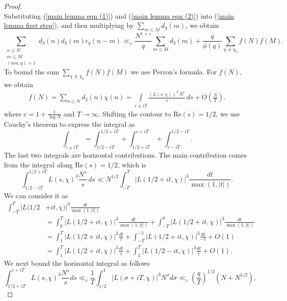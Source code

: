 \documentclass[oneside,reqno,10pt]{amsart}
\numberwithin{equation}{section}
\theoremstyle{plain}
\theoremstyle{definition}
\numberwithin{equation}{section}
\begin{document}
\begin{proof}
\begin{equation}
\end{equation}
Substituting (\ref{main lemma eqn (1)}) and (\ref{main lemma eqn (2)}) into (\ref{main lemma first step}), and then multiplying by $\sum_{m\leq M} d_3(m)$, we obtain
\begin{equation}\label{goal of the main lemma}
    \sum_{\substack{n\leq N\\m\leq M \\ (nm,q)=1}} d_3(n)d_3(m)c_q(n-m) \ll_{\varepsilon} \frac{N^{1+\varepsilon}}{q}\sum_{m\leq M}d_3(m) + \frac{q}{\phi(q)}\sum_{\chi \neq \chi_0} f(N)f(M).
\end{equation}
To bound the sum $\sum_{\chi\neq \chi_0} f(N)f(M)$ we use Perron's formula. For $f(N)$, we obtain
\begin{align*}
f(N) = \sum_{n \leq N} d_{3}(n)   \chi(n) = \int\limits_{c\pm iT} \frac{(L(s, \chi))^3\ N^s}{s} \, ds + O\left( \frac{N}{T} \right).
\end{align*}
where  $c = 1 + \frac{1}{\log N}$  and $T\to \infty$. Shifting the contour to Re$(s)=1/2$, we use Cauchy's theorem to express the integral as
\begin{equation*}
    \int_{c \pm iT} = \int_{1/2-iT}^{1/2+iT} + \int_{1/2+iT}^{c+iT} + \int_{c-iT}^{1/2-iT}. 
\end{equation*}
The last two integrals are horizontal contributions. The main contribution comes from the integral along Re$(s)=1/2$, which is
\begin{equation*}
    \int_{1/2-iT}^{1/2+iT}L(s,\chi)^3\frac{N^s}{s}\, ds\ll N^{1/2}\int_{-T}^T|L(1/2+it,\chi)|^3\frac{dt}{\max(1,|t|)}.
\end{equation*}
We can consider it as
    \begin{align}\nonumber
        \int_{-T}^T|L(1/2&+it,\chi)|^3\frac{dt}{\max(1,|t|)}\\ \nonumber
        &=\int_{0}^T|L(1/2+it,\chi)|^3\frac{dt}{\max(1,|t|)}+\int_{-T}^0|L(1/2+it,\chi)|^3\frac{dt}{\max(1,|t|)}\\ \nonumber
        &=\int_{1}^T|L(1/2+it,\chi)|^3\frac{dt}{t}+\int_{-T}^{-1}|L(1/2+it,\chi)|^3\frac{dt}{-t}+O(1)\\ 
        &=\int_{1}^T|L(1/2+it,\chi)|^3\frac{dt}{t}+\int_{1}^{T}|L(1/2-it,\chi)|^3\frac{dt}{t}+O(1).
    \end{align} 
We next bound the horizontal integral as follows    
\begin{equation}
    \int_{1/2+iT}^{c+iT} L(s,\chi)^3 \frac{N^s}{s}ds \ll_{\varepsilon} \frac{1}{T}\int_{1/2}^1 |L(\sigma+iT,\chi)|^3 N^{\sigma} d\sigma \ll_{\varepsilon}  \left(\frac{q}{T}\right)^{1/2} (N+N^{1/2}),

\end{equation}
\end{proof}
\end{document}
